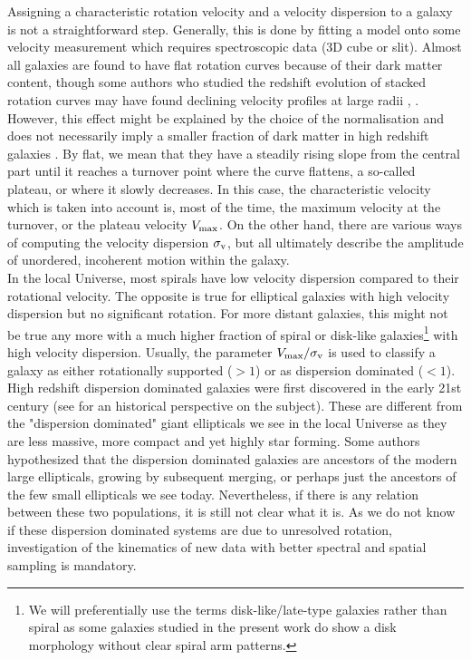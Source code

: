 Assigning a characteristic rotation velocity and a velocity dispersion to a galaxy is not a straightforward step. Generally, this is done by fitting a model onto some velocity measurement which requires spectroscopic data (3D cube or slit). Almost all galaxies are found to have flat rotation curves because of their dark matter content, though some authors who studied the redshift evolution of stacked rotation curves may have found declining velocity profiles at large radii , . However, this effect might be explained by the choice of the normalisation and does not necessarily imply a smaller fraction of dark matter in high redshift galaxies . By flat, we mean that they have a steadily rising slope from the central part until it reaches a turnover point where the curve flattens, a so-called plateau, or where it slowly decreases. In this case, the characteristic velocity which is taken into account is, most of the time, the maximum velocity at the turnover, or the plateau velocity $V_{\rm{max}}$. On the other hand, there are various ways of computing the velocity dispersion $\sigma_{\rm{v}}$, but all ultimately describe the amplitude of unordered, incoherent motion within the galaxy.\\

In the local Universe, most spirals have low velocity dispersion compared to their rotational velocity. The opposite is true for elliptical galaxies with high velocity dispersion but no significant rotation. For more distant galaxies, this might not be true any more with a much higher fraction of spiral or disk-like galaxies\footnote{We will preferentially use the terms disk-like/late-type galaxies rather than spiral as some galaxies studied in the present work do show a disk morphology without clear spiral arm patterns.} with high velocity dispersion. Usually, the parameter $V_{\rm{max}} / \sigma_{\rm{v}}$ is used to classify a galaxy as either rotationally supported ($> 1$) or as dispersion dominated ($< 1$). High redshift dispersion dominated galaxies were first discovered in the early 21st century (see  for an historical perspective on the subject). These are different from the "dispersion dominated" giant ellipticals we see in the local Universe as they are less massive, more compact and yet highly star forming. Some authors hypothesized that the dispersion dominated galaxies are ancestors of the modern large ellipticals, growing by subsequent merging, or perhaps just the ancestors of the few small ellipticals we see today. Nevertheless, if there is any relation between these two populations, it is still not clear what it is. As we do not know if these dispersion dominated systems are due to unresolved rotation, investigation of the kinematics of new data with better spectral and spatial sampling is mandatory.\\



